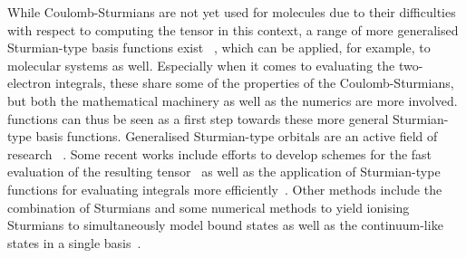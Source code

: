 While Coulomb-Sturmians are not yet used for molecules
due to their difficulties with respect to computing the \ERI tensor
in this context,
a range of more generalised Sturmian-type basis functions exist%
~\cite{Hoggan2009,Avery2011},
which can be applied, for example, to molecular systems as well.
Especially when it comes to evaluating the two-electron integrals,
these share some of the properties of the Coulomb-Sturmians,
but both the mathematical machinery as well as the numerics are more involved.
\CS functions can thus be seen as a first step towards these
more general Sturmian-type basis functions.
Generalised Sturmian-type orbitals are an active field of research%
~\cite{%
	Gruzdev1990,%
	Aquilanti1996,Aquilanti1997,Aquilanti1998,Aquilanti2001,Aquilanti2003,%
	Avery2003,Avery2004,Avery2006,Hoggan2009,%
	Randazzo2010,Mitnik2011,%
	Avery2011,Avery2011PhD,%
	Avery2013,Avery2015,Randazzo2015,Granados2016,Abdouraman2016,%
	Morales2016,Avery2017,Avery2018%
}.
Some recent works include efforts to develop schemes for the
fast evaluation of the resulting \ERI tensor~\cite{Avery2013,Avery2017,Avery2018}
as well as the application of Sturmian-type functions
for evaluating \STO integrals more efficiently~\cite{Morales2016,Avery2017}.
Other methods include the combination of
Sturmians and some numerical methods to yield ionising Sturmians
to simultaneously model bound states as well as the continuum-like states
in a single basis~\cite{Randazzo2010,Mitnik2011,Randazzo2015,Granados2016,Abdouraman2016}.

